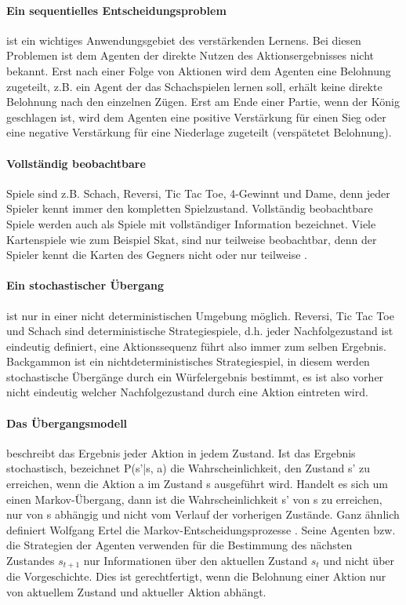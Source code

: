 \paragraph{Ein sequentielles Entscheidungsproblem} ist ein wichtiges Anwendungsgebiet des verstärkenden Lernens. Bei diesen Problemen ist dem Agenten der direkte Nutzen des Aktionsergebnisses nicht bekannt. Erst nach einer Folge von Aktionen wird dem Agenten eine Belohnung zugeteilt, z.B. ein Agent der das Schachspielen lernen soll, erhält keine direkte Belohnung nach den einzelnen Zügen. Erst am Ende einer Partie, wenn der König geschlagen ist, wird dem Agenten eine positive Verstärkung für einen Sieg oder eine negative Verstärkung für eine Niederlage zugeteilt (verspätetet Belohnung).

\paragraph{Vollständig beobachtbare} Spiele sind z.B. Schach, Reversi, Tic Tac Toe, 4-Gewinnt und Dame, denn jeder Spieler kennt immer den kompletten Spielzustand. Vollständig beobachtbare Spiele werden auch als Spiele mit vollständiger Information bezeichnet. Viele Kartenspiele wie zum Beispiel Skat, sind nur teilweise beobachtbar, denn der Spieler kennt die Karten des Gegners nicht oder nur teilweise \cite[114]{Ertel}.

\paragraph{Ein stochastischer Übergang} ist nur in einer nicht deterministischen Umgebung möglich. Reversi, Tic Tac Toe und Schach sind deterministische Strategiespiele, d.h. jeder Nachfolgezustand ist eindeutig definiert, eine Aktionssequenz führt also immer zum selben Ergebnis. Backgammon ist ein nichtdeterministisches Strategiespiel, in diesem werden stochastische Übergänge durch ein Würfelergebnis bestimmt, es ist also vorher nicht eindeutig welcher Nachfolgezustand durch eine Aktion eintreten wird.

\paragraph{Das Übergangsmodell} beschreibt das Ergebnis jeder Aktion in jedem Zustand. Ist das Ergebnis stochastisch, bezeichnet P(s'|s, a) die Wahrscheinlichkeit, den Zustand s' zu erreichen, wenn die Aktion a im Zustand s ausgeführt wird. Handelt es sich um einen Markov-Übergang, dann ist die Wahrscheinlichkeit s' von s zu erreichen, nur von s abhängig und nicht vom Verlauf der vorherigen Zustände. Ganz ähnlich definiert Wolfgang Ertel die Markov-Entscheidungsprozesse \cite[291]{Ertel}. Seine Agenten bzw. die Strategien der Agenten verwenden für die Bestimmung des nächsten Zustandes $s_{t+1}$ nur Informationen über den aktuellen Zustand $s_t$ und nicht über die Vorgeschichte. Dies ist gerechtfertigt, wenn die Belohnung einer Aktion nur von aktuellem Zustand und aktueller Aktion abhängt.

